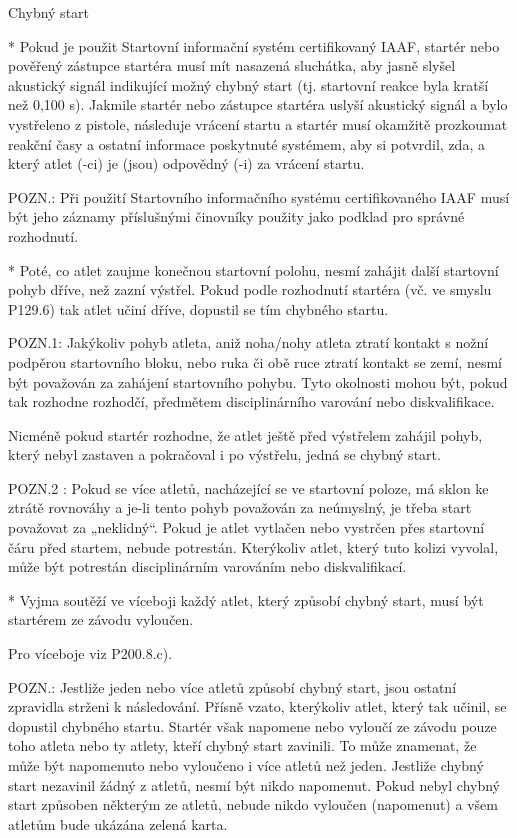 Chybný start

* Pokud je použit Startovní informační systém certifikovaný IAAF, startér nebo pověřený zástupce startéra musí mít nasazená sluchátka, aby jasně slyšel akustický signál indikující možný chybný start (tj. startovní reakce byla kratší než 0,100 s). Jakmile startér nebo zástupce startéra uslyší akustický signál a bylo vystřeleno z pistole, následuje vrácení startu a startér musí okamžitě prozkoumat reakční časy a ostatní informace poskytnuté systémem, aby si potvrdil, zda, a který atlet (-ci) je (jsou) odpovědný (-i) za vrácení startu.

POZN.: Při použití Startovního informačního systému certifikovaného IAAF musí být jeho záznamy příslušnými činovníky použity jako podklad pro správné rozhodnutí.

* Poté, co atlet zaujme konečnou startovní polohu, nesmí zahájit další startovní pohyb dříve, než zazní výstřel. Pokud podle rozhodnutí startéra (vč. ve smyslu P129.6) tak atlet učiní dříve, dopustil se tím chybného startu.

POZN.1: Jakýkoliv pohyb atleta, aniž noha/nohy atleta ztratí kontakt s nožní podpěrou startovního bloku, nebo ruka či obě ruce ztratí kontakt se zemí, nesmí být považován za zahájení startovního pohybu. Tyto okolnosti mohou být, pokud tak rozhodne rozhodčí, předmětem disciplinárního varování nebo diskvalifikace.

Nicméně pokud startér rozhodne, že atlet ještě před výstřelem zahájil pohyb, který nebyl zastaven a pokračoval i po výstřelu, jedná se chybný start.

POZN.2 : Pokud se více atletů, nacházející se ve startovní poloze, má sklon ke ztrátě rovnováhy a je-li tento pohyb považován za neúmyslný, je třeba start považovat za „neklidný“. Pokud je atlet vytlačen nebo vystrčen přes startovní čáru před startem, nebude potrestán. Kterýkoliv atlet, který tuto kolizi vyvolal, může být potrestán disciplinárním varováním nebo diskvalifikací.

* Vyjma soutěží ve víceboji každý atlet, který způsobí chybný start, musí být startérem ze závodu vyloučen.

Pro víceboje viz P200.8.c).

POZN.: Jestliže jeden nebo více atletů způsobí chybný start, jsou ostatní zpravidla strženi k následování. Přísně vzato, kterýkoliv atlet, který tak učinil, se dopustil chybného startu.  Startér však napomene nebo vyloučí ze závodu pouze toho atleta nebo ty atlety, kteří chybný start zavinili. To může znamenat, že může být napomenuto nebo vyloučeno i více atletů než jeden. Jestliže chybný start nezavinil žádný z atletů, nesmí být nikdo napomenut. Pokud nebyl chybný start způsoben některým ze atletů, nebude nikdo vyloučen (napomenut) a všem atletům bude ukázána zelená karta.

